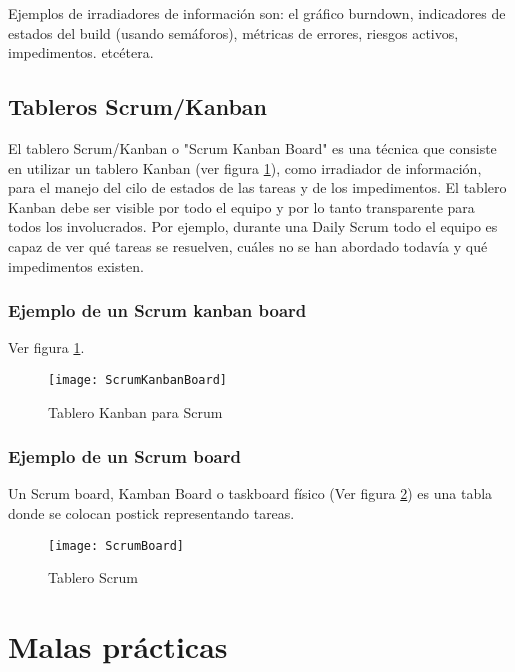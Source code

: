 Ejemplos de irradiadores de información son: el gráfico burndown, indicadores de estados del build (usando semáforos), métricas de errores, riesgos activos, impedimentos. etcétera.

\subsection{Tableros Scrum/Kanban}

El tablero Scrum/Kanban o "Scrum Kanban Board" es una técnica que consiste en utilizar un tablero Kanban (ver figura \ref{fig:ScrumKanbanBoard}), como irradiador de información, para el manejo del cilo de estados de las tareas y de los impedimentos. El tablero Kanban debe ser visible por todo el equipo y por lo tanto transparente para todos los involucrados. Por ejemplo, durante una Daily Scrum todo el equipo es capaz de ver qué tareas se resuelven, cuáles no se han abordado todavía y qué impedimentos existen.

\subsubsection{Ejemplo de un Scrum kanban board}

Ver figura \ref{fig:ScrumKanbanBoard}.

\begin{figure}[h]
  \centering
  \texttt{[image: ScrumKanbanBoard]}
  \caption{Tablero Kanban para Scrum}
  \centering
  \label{fig:ScrumKanbanBoard} %
\end{figure}

\subsubsection{Ejemplo de un Scrum board}

Un Scrum board, Kamban Board o taskboard físico (Ver figura \ref{fig:ScrumBoard}) es una tabla donde se colocan postick representando tareas.

\begin{figure}[h]
  \centering
  \texttt{[image: ScrumBoard]}
  \caption{Tablero Scrum}
  \centering
  \label{fig:ScrumBoard} %
\end{figure}

\newpage
\section{Malas prácticas}

